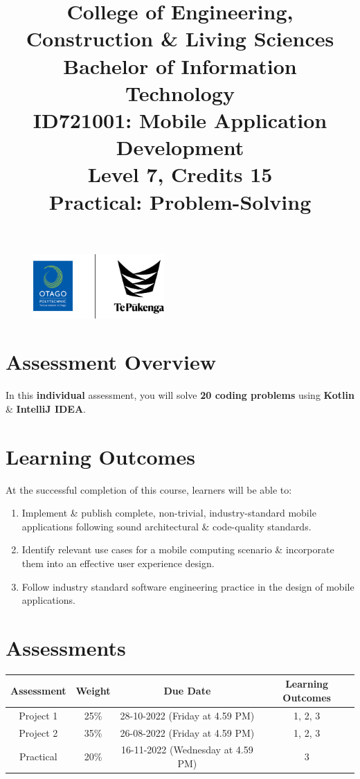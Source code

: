 \documentclass{article}
\author{}
\begin{document}
\begin{figure}
  \centering
  \includegraphics[width=50mm]{../../resources/img/logo.png}
\end{figure}

\title{College of Engineering, Construction \& Living Sciences\\Bachelor of Information Technology\\ID721001: Mobile Application Development\\Level 7, Credits 15\\\textbf{Practical: Problem-Solving}}
\date{}
\maketitle

\section*{Assessment Overview}
In this \textbf{individual} assessment, you will solve \textbf{20 coding problems} using \textbf{Kotlin} \& \textbf{IntelliJ IDEA}.

\section*{Learning Outcomes}
At the successful completion of this course, learners will be able to:
\begin{enumerate}
  \item Implement \& publish complete, non-trivial, industry-standard mobile applications following sound architectural \& code-quality standards.
  \item Identify relevant use cases for a mobile computing scenario \& incorporate them into an effective user experience design.
  \item Follow industry standard software engineering practice in the design of mobile applications.
\end{enumerate}

\section*{Assessments}
\renewcommand{\arraystretch}{1.5}
\begin{tabular}{|c|c|c|c|}
	\hline
	\textbf{Assessment} & \textbf{Weight} & \textbf{Due Date}    & \textbf{Learning Outcomes} \\ \hline
	Project 1            & 25\%            & 28-10-2022 (Friday at 4.59 PM)  & 1, 2, 3                    \\ \hline
	Project 2         & 35\%            & 26-08-2022 (Friday at 4.59 PM) & 1, 2, 3                    \\ \hline
	Practical       & 20\%            & 16-11-2022 (Wednesday at 4.59 PM) & 3                       \\ \hline
\end{tabular}
\end{document}
